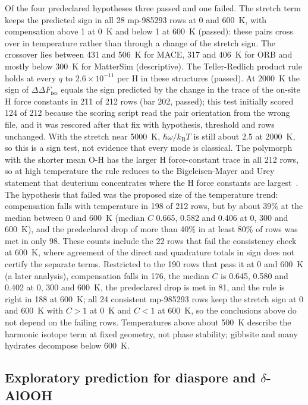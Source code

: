 \documentclass[aps,prmaterials,reprint,superscriptaddress,nofootinbib]{revtex4-2}
\newcommand{\ddF}{\Delta\Delta F_{\mathrm{iso}}}
\begin{document}
Of the four predeclared hypotheses three passed and one failed. The stretch term keeps the predicted sign in all 28 mp-985293 rows at 0 and 600~K, with compensation above 1 at 0~K and below 1 at 600~K (passed): these pairs cross over in temperature rather than through a change of the stretch sign. The crossover lies between 431 and 506~K for MACE, 317 and 406~K for ORB and mostly below 300~K for MatterSim (descriptive). The Teller-Redlich product rule holds at every $q$ to $2.6\times10^{-11}$ per H in these structures (passed). At 2000~K the sign of $\ddF$ equals the sign predicted by the change in the trace of the on-site H force constants in 211 of 212 rows (bar 202, passed); this test initially scored 124 of 212 because the scoring script read the pair orientation from the wrong file, and it was rescored after that fix with hypothesis, threshold and rows unchanged. With the stretch near 5000~K, $\hbar\omega/k_{\mathrm{B}}T$ is still about 2.5 at 2000~K, so this is a sign test, not evidence that every mode is classical. The polymorph with the shorter mean O-H has the larger H force-constant trace in all 212 rows, so at high temperature the rule reduces to the Bigeleisen-Mayer and Urey statement that deuterium concentrates where the H force constants are largest~\cite{Bigeleisen1947,Urey1947}. The hypothesis that failed was the proposed size of the temperature trend: compensation falls with temperature in 198 of 212 rows, but by about 39\% at the median between 0 and 600~K (median $C$ 0.665, 0.582 and 0.406 at 0, 300 and 600~K), and the predeclared drop of more than 40\% in at least 80\% of rows was met in only 98. These counts include the 22 rows that fail the consistency check at 600~K, where agreement of the direct and quadrature totals in sign does not certify the separate terms. Restricted to the 190 rows that pass it at 0 and 600~K (a later analysis), compensation falls in 176, the median $C$ is 0.645, 0.580 and 0.402 at 0, 300 and 600~K, the predeclared drop is met in 81, and the rule is right in 188 at 600~K; all 24 consistent mp-985293 rows keep the stretch sign at 0 and 600~K with $C>1$ at 0~K and $C<1$ at 600~K, so the conclusions above do not depend on the failing rows. Temperatures above about 500~K describe the harmonic isotope term at fixed geometry, not phase stability; gibbsite and many hydrates decompose below 600~K.

\subsection{Exploratory prediction for diaspore and \texorpdfstring{$\delta$}{delta}-AlOOH}
\label{sec:alooh}
\end{document}
